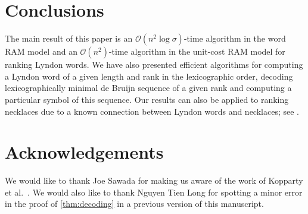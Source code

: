 \documentclass{article}
\newcommand{\Oh}{\mathcal{O}}
\theoremstyle{definition}
\theoremstyle{remark}
\begin{document}
\section{Conclusions}\label{sec:concl}

The main result of this paper is an $\Oh(n^2 \log \sigma)$-time algorithm in the word RAM model
and an $\Oh(n^2)$-time algorithm in the unit-cost RAM model for ranking Lyndon words.
We have also presented efficient algorithms for computing a Lyndon word of a given length and rank
in the lexicographic order, decoding lexicographically minimal de Bruijn sequence
of a given rank and computing a particular symbol of this sequence.
Our results can also be applied to ranking necklaces due to a known connection
between Lyndon words and necklaces; see \cite{DBLP:conf/icalp/KoppartyKS14}.




\section{Acknowledgements}

We would like to thank Joe Sawada for making us aware of the work of Kopparty et al.\ \cite{DBLP:conf/icalp/KoppartyKS14}.
We would also like to thank Nguyen Tien Long for spotting a minor error in the proof of \cref{thm:decoding} in a previous version of this manuscript.






\end{document}
